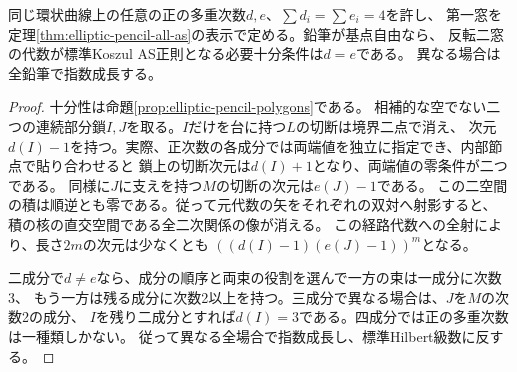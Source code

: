 \begin{corollary}[正の多重次数の必要十分条件]\label{cor:elliptic-polygon-degree-balance}
同じ環状曲線上の任意の正の多重次数$d,e$、$\sum d_i=\sum e_i=4$を許し、
第一窓を定理\ref{thm:elliptic-pencil-all-as}の表示で定める。鉛筆が基点自由なら、
反転二窓の代数が標準Koszul AS正則となる必要十分条件は$d=e$である。
異なる場合は全鉛筆で指数成長する。
\end{corollary}
\begin{proof}
十分性は命題\ref{prop:elliptic-pencil-polygons}である。
相補的な空でない二つの連続部分鎖$I,J$を取る。$I$だけを台に持つ$L$の切断は境界二点で消え、
次元$d(I)-1$を持つ。実際、正次数の各成分では両端値を独立に指定でき、内部節点で貼り合わせると
鎖上の切断次元は$d(I)+1$となり、両端値の零条件が二つである。
同様に$J$に支えを持つ$M$の切断の次元は$e(J)-1$である。
この二空間の積は順逆とも零である。従って元代数の矢をそれぞれの双対へ射影すると、
積の核の直交空間である全二次関係の像が消える。
この経路代数への全射により、長さ$2m$の次元は少なくとも
$((d(I)-1)(e(J)-1))^m$となる。

二成分で$d\ne e$なら、成分の順序と両束の役割を選んで一方の束は一成分に次数3、
もう一方は残る成分に次数2以上を持つ。三成分で異なる場合は、$J$を$M$の次数2の成分、
$I$を残り二成分とすれば$d(I)=3$である。四成分では正の多重次数は一種類しかない。
従って異なる全場合で指数成長し、標準Hilbert級数に反する。
\end{proof}

